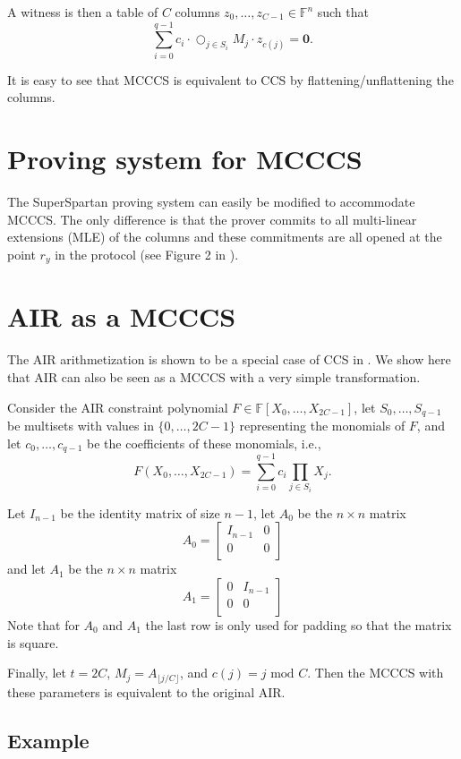 \documentclass[a4paper]{article}
\begin{document}
A witness is then a table of $C$ columns $z_0,\dots,z_{C-1}\in \mathbb{F}^n$ such that 
$$
\sum_{i=0}^{q-1} c_i \cdot \bigcirc_{j\in S_i} M_j \cdot z_{c(j)} = \mathbf{0}.
$$

It is easy to see that MCCCS is equivalent to CCS by flattening/unflattening the columns. 

\section*{Proving system for MCCCS}
The SuperSpartan proving system can easily be modified to accommodate MCCCS. The only difference is that the prover commits to all multi-linear extensions (MLE) of the columns and these commitments are all opened at the point $r_y$ in the protocol (see Figure 2 in \cite{cryptoeprint:2023/552}).

\section*{AIR as a MCCCS}
The AIR arithmetization is shown to be a special case of CCS in \cite{cryptoeprint:2023/552}. We show here that AIR can also be seen as a MCCCS with a very simple transformation.

Consider the AIR constraint polynomial $F \in \mathbb{F}[X_0,\dots,X_{2C-1}]$, let $S_0,\dots,S_{q-1}$ be multisets with values in $\{0,\dots,2C-1\}$ representing the monomials of $F$, and let $c_0,\dots,c_{q-1}$ be the coefficients of these monomials, i.e., 
$$
F(X_0,\dots,X_{2C-1}) = \sum_{i=0}^{q-1} c_i \prod_{j\in S_i}X_j.
$$

Let $I_{n-1}$ be the identity matrix of size $n-1$, let $A_0$ be the 
$n\times n$ matrix
$$ A_0 = 
\begin{bmatrix}
I_{n-1} & 0 \\
0 & 0      \\
\end{bmatrix}
$$
and let $A_1$ be the $n\times n$ matrix
$$
A_1 = 
\begin{bmatrix}
0 & I_{n-1} \\
0 & 0      \\
\end{bmatrix}
$$
Note that for $A_0$ and $A_1$ the last row is only used for padding so that the matrix is square. 

Finally, let $t=2C$, $M_j=A_{\lfloor j/C \rfloor}$, and $c(j)=j \text{ mod } C$. Then the MCCCS with these parameters is equivalent to the original AIR.

\subsection*{Example}
\end{document}

